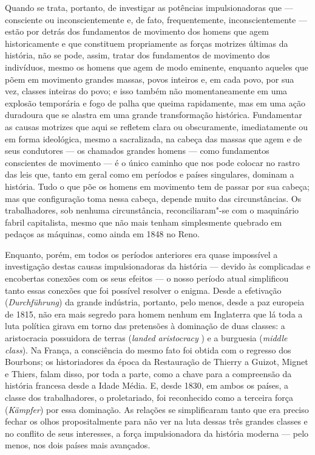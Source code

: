 Quando se trata, portanto, de investigar as potências impulsionadoras
que --- consciente ou inconscientemente e, de fato, frequentemente,
inconscientemente --- estão por detrás dos fundamentos de movimento dos
homens que agem historicamente e que constituem propriamente as forças
motrizes últimas da história, não se pode, assim, tratar dos fundamentos
de movimento dos indivíduos, mesmo os homens que agem de modo eminente,
enquanto aqueles que põem em movimento grandes massas, povos inteiros e,
em cada povo, por sua vez, classes inteiras do povo; e isso também não
momentaneamente em uma explosão temporária e fogo de palha que queima
rapidamente, mas em uma ação duradoura que se alastra em uma grande
transformação histórica. Fundamentar as causas motrizes que aqui se
refletem clara ou obscuramente, imediatamente ou em forma ideológica,
mesmo a sacralizada, na cabeça das massas que agem e de seus condutores
--- os chamados grandes homens --- como fundamentos conscientes de movimento
--- é o único caminho que nos pode colocar no rastro das leis que, tanto
em geral como em períodos e países singulares, dominam a história. Tudo
o que põe os homens em movimento tem de passar por sua cabeça; mas que
configuração toma nessa cabeça, depende muito das circunstâncias. Os
trabalhadores, sob nenhuma circunstância, reconciliaram"-se com o
maquinário fabril capitalista, mesmo que não mais tenham simplesmente
quebrado em pedaços as máquinas, como ainda em 1848 no Reno.

Enquanto, porém, em todos os períodos anteriores era quase impossível a
investigação destas causas impulsionadoras da história --- devido às
complicadas e encobertas conexões com os seus efeitos --- o nosso período
atual simplificou tanto essas conexões que foi possível resolver o
enigma. Desde a efetivação (\emph{Durchführung}) da grande indústria,
portanto, pelo menos, desde a paz europeia de 1815, não era mais segredo
para homem nenhum em Inglaterra que lá toda a luta política girava em
torno das pretensões à dominação de duas classes: a aristocracia
possuidora de terras (\emph{landed
aristocracy }) e a burguesia (\emph{middle
class}). Na França, a consciência do mesmo
fato foi obtida com o regresso dos Bourbons; os historiadores da época
da Restauração de Thierry a Guizot, Mignet e Thiers,
falam disso, por toda a parte, como a chave para a compreensão da
história francesa desde a Idade Média. E, desde 1830, em ambos os
países, a classe dos trabalhadores, o proletariado, foi reconhecido como
a terceira força (\emph{Kämpfer}) por essa dominação. As relações se
simplificaram tanto que era preciso fechar os olhos propositalmente para
não ver na luta dessas três grandes classes e no conflito de seus
interesses, a força impulsionadora da história moderna --- pelo menos, nos
dois países mais avançados.

